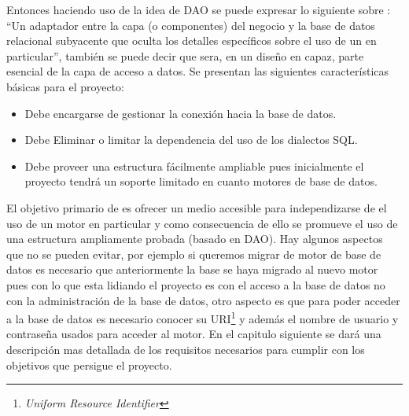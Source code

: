 Entonces haciendo uso de la idea de DAO se puede expresar lo siguiente sobre \jj: ``Un adaptador entre la capa (o componentes) del negocio y la base de datos relacional subyacente que oculta los detalles específicos sobre el uso de un \dd en particular'', también se puede decir que \jj sera, en un diseño en capaz, parte esencial de la capa de acceso a datos. Se presentan las siguientes características básicas para el proyecto:
%
\begin{itemize}
\item Debe encargarse de gestionar la conexión hacia la base de datos.
\item Debe Eliminar o limitar la dependencia del uso de los dialectos SQL.
\item Debe proveer una estructura fácilmente ampliable pues inicialmente el proyecto tendrá un soporte limitado en cuanto motores de base de datos.
\end{itemize}
%
El objetivo primario de \jj es ofrecer un medio accesible para independizarse de el uso de un motor en particular y como consecuencia de ello se promueve el uso de una estructura ampliamente probada (basado en DAO). Hay algunos aspectos que no se pueden evitar, por ejemplo si queremos migrar de motor de base de datos es necesario que anteriormente la base se haya migrado al nuevo motor pues con lo que esta lidiando el proyecto es con el acceso a la base de datos no con la administración de la base de datos, otro aspecto es que para poder acceder a la base de datos es necesario conocer su URI\footnote{\textit{Uniform Resource Identifier}} y además el nombre de usuario y contraseña usados para acceder al motor. En el capitulo siguiente se dará una descripción mas detallada de los requisitos necesarios para cumplir con los objetivos que persigue el proyecto. 
